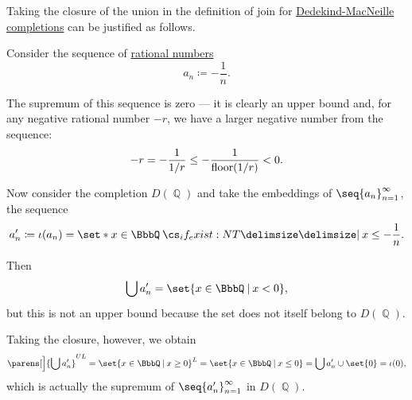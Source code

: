 \begin{example}\label{ex:dedekind_macnielle_join_closure}
  Taking the closure of the union in the definition of join for \hyperref[def:dedekind_macnielle_completion]{Dedekind-MacNeille completions} can be justified as follows.

  Consider the sequence of \hyperref[def:rational_numbers]{rational numbers}
  \begin{equation*}
    a_n \coloneqq -\frac 1 n.
  \end{equation*}

  The supremum of this sequence is zero --- it is clearly an upper bound and, for any negative rational number \( -r \), we have a larger negative number from the sequence:
  \begin{equation*}
    -r
    =
    -\frac 1 {1 / r}
    \leq
    -\frac 1 {\operatorname{floor}(1 / r)}
    <
    0.
  \end{equation*}

  Now consider the completion \( D(\BbbQ) \) and take the embeddings of \( \seq{ a_n }_{n=1}^\infty \), the sequence
  \begin{equation*}
    a_n' \coloneqq \iota(a_n) = \set*{ x \in \BbbQ \given* x \leq -\frac 1 n }.
  \end{equation*}

  Then
  \begin{equation*}
    \bigcup a_n' = \set{ x \in \BbbQ \given x < 0 },
  \end{equation*}
  but this is not an upper bound because the set does not itself belong to \( D(\BbbQ) \).

  Taking the closure, however, we obtain
  \begin{equation*}
    \parens[\Big]{ \bigcup a_n' }^{UL}
    =
    \set{ x \in \BbbQ \given x \geq 0 }^L
    =
    \set{ x \in \BbbQ \given x \leq 0 }
    =
    \bigcup a_n' \cup \set{ 0 }
    =
    \iota(0),
  \end{equation*}
  which is actually the supremum of \( \seq{ a_n' }_{n=1}^\infty \) in \( D(\BbbQ) \).
\end{example}

